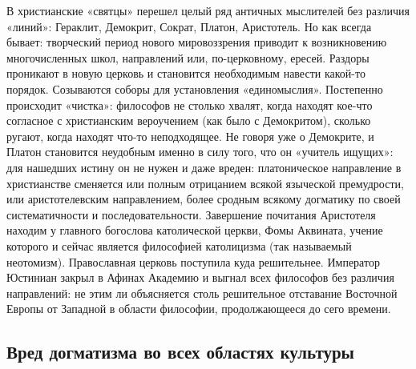 В  христианские «святцы»  перешел  целый ряд  античных мыслителей  без
различия «линий»:  Гераклит, Демокрит, Сократ, Платон,  Аристотель. Но
как всегда  бывает: творческий период нового  мировоззрения приводит к
возникновению  многочисленных  школ, направлений  или,  по-церковному,
ересей.  Раздоры проникают  в новую  церковь и  становится необходимым
навести   какой-то  порядок.   Созываются   соборы  для   установления
«единомыслия».  Постепенно происходит  «чистка»: философов  не столько
хвалят,  когда находят  кое-что согласное  с христианским  вероучением
(как  было  с  Демокритом),   сколько  ругают,  когда  находят  что-то
неподходящее. Не говоря уже о Демокрите, и Платон становится неудобным
именно в  силу того, что он  «учитель ищущих»: для нашедших  истину он
не  нужен  и даже  вреден:  платоническое  направление в  христианстве
сменяется  или полным  отрицанием  всякой  языческой премудрости,  или
аристотелевским  направлением,  более  сродным  всякому  догматику  по
своей  систематичности  и   последовательности.  Завершение  почитания
Аристотеля  находим у  главного  богослова  католической церкви,  Фомы
Аквината,  учение которого  и сейчас  является философией  католицизма
(так  называемый  неотомизм).   Православная  церковь  поступила  куда
решительнее.  Император Юстиниан  закрыл  в Афинах  Академию и  выгнал
всех  философов  без  различия  направлений: не  этим  ли  объясняется
столь решительное  отставание Восточной  Европы от Западной  в области
философии, продолжающееся до сего времени.

\subsection{Вред догматизма во всех областях культуры}

